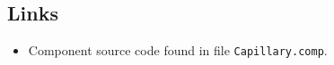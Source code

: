\subsection*{Links}
\begin{itemize}
  \item Component source code found in file \texttt{Capillary.comp}.
\end{itemize}
